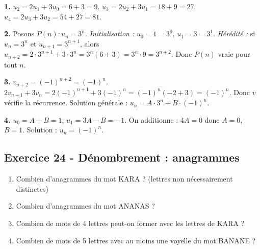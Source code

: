 \documentclass[12pt,a4paper]{article}
\begin{document}
\begin{boitecorrige}
\textbf{1.} $u_2 = 2u_1 + 3u_0 = 6 + 3 = 9$. $u_3 = 2u_2 + 3u_1 = 18 + 9 = 27$. $u_4 = 2u_3 + 3u_2 = 54 + 27 = 81$.

\textbf{2.} Posons $P(n) : u_n = 3^n$.
\textit{Initialisation :} $u_0 = 1 = 3^0$, $u_1 = 3 = 3^1$.
\textit{Hérédité :} si $u_n = 3^n$ et $u_{n+1} = 3^{n+1}$, alors $u_{n+2} = 2\cdot 3^{n+1} + 3\cdot 3^n = 3^n(6+3) = 3^n\cdot 9 = 3^{n+2}$.
Donc $P(n)$ vraie pour tout $n$.

\textbf{3.} $v_{n+2} = (-1)^{n+2} = (-1)^n$. $2v_{n+1}+3v_n = 2(-1)^{n+1}+3(-1)^n = (-1)^n(-2+3) = (-1)^n$. Donc $v$ vérifie la récurrence. Solution générale : $u_n = A\cdot 3^n + B\cdot(-1)^n$.

\textbf{4.} $u_0 = A+B = 1$, $u_1 = 3A - B = -1$. On additionne : $4A = 0$ donc $A = 0$, $B = 1$. Solution : $u_n = (-1)^n$.
\end{boitecorrige}

\subsection*{Exercice 24 - Dénombrement : anagrammes \niveau{\moyen}}

\begin{boiteexercice}
\begin{enumerate}
  \item Combien d'anagrammes du mot \textsc{KARA} ? (lettres non nécessairement distinctes)
  \item Combien d'anagrammes du mot \textsc{ANANAS} ?
  \item Combien de mots de 4 lettres peut-on former avec les lettres de \textsc{KARA} ?
  \item Combien de mots de 5 lettres avec au moins une voyelle du mot \textsc{BANANE} ?
\end{enumerate}
\end{boiteexercice}
\end{document}

